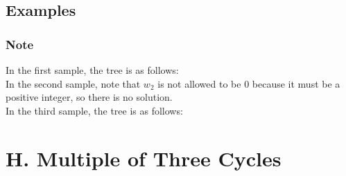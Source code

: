 \documentclass{article}
\begin{document}
\subsection*{Examples}
\subsubsection*{Note}In the first sample, the tree is as follows:  \\ In the second sample, note that $w_2$ is not allowed to be $0$ because it must be a positive integer, so there is no solution.\\ In the third sample, the tree is as follows:
\newpage
\section*{H. Multiple of Three Cycles}
\end{document}
